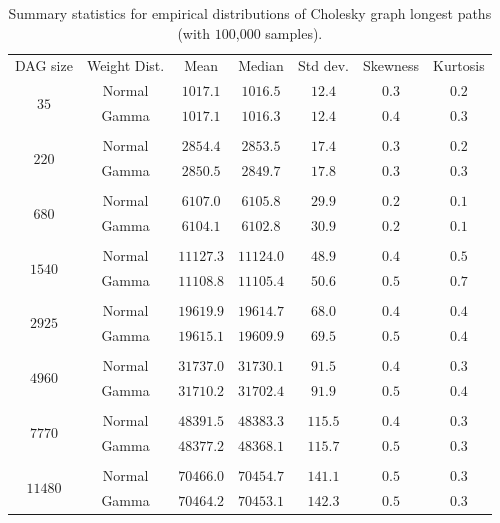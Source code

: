 \documentclass[12pt]{article}
\begin{document}
 \begin{table}
	\caption{Summary statistics for empirical distributions of Cholesky graph longest paths (with $100$,$000$ samples).} 
	\begin{center}	
		\begin{tabular}{c c c c c c c}
                  \toprule
                  DAG size & Weight Dist. & Mean & Median & Std dev. & Skewness & Kurtosis \\
                  \cmidrule{1-7}
                  \multirow{2}{*}{$35$} & Normal & $1017.1$ & $1016.5$ & $12.4$ & $0.3$ & $0.2$\\
                           & Gamma & $1017.1$ & $1016.3$ & $12.4$ & $0.4$ & $0.3$\\
                  \\
                  \multirow{2}{*}{$220$} & Normal & $2854.4$ & $2853.5$ & $17.4$ & $0.3$ & $0.2$\\
                           & Gamma & $2850.5$ & $2849.7$ & $17.8$ & $0.3$ & $0.3$\\
                  \\
                  \multirow{2}{*}{$680$} & Normal & $6107.0$ & $6105.8$ & $29.9$ & $0.2$ & $0.1$\\
                           & Gamma & $6104.1$ & $6102.8$ & $30.9$ & $0.2$ & $0.1$\\
                  \\
                  \multirow{2}{*}{$1540$} & Normal & $11127.3$ & $11124.0$ & $48.9$ & $0.4$ & $0.5$\\
                           & Gamma & $11108.8$ & $11105.4$ & $50.6$ & $0.5$ & $0.7$\\
                  \\
                  \multirow{2}{*}{$2925$} & Normal & $19619.9$ & $19614.7$ & $68.0$ & $0.4$ & $0.4$\\
                           & Gamma & $19615.1$ & $19609.9$ & $69.5$ & $0.5$ & $0.4$\\
                  \\
                  \multirow{2}{*}{$4960$} & Normal & $31737.0$ & $31730.1$ & $91.5$ & $0.4$ & $0.3$\\
                           & Gamma & $31710.2$ & $31702.4$ & $91.9$ & $0.5$ & $0.4$\\
                  \\
                  \multirow{2}{*}{$7770$} & Normal & $48391.5$ & $48383.3$ & $115.5$ & $0.4$ & $0.3$\\
                           & Gamma & $48377.2$ & $48368.1$ & $115.7$ & $0.5$ & $0.3$\\
                  \\
                  \multirow{2}{*}{$11480$} & Normal & $70466.0$ & $70454.7$ & $141.1$ & $0.5$ & $0.3$\\
                           & Gamma & $70464.2$ & $70453.1$ & $142.3$ & $0.5$ & $0.3$\\
		\bottomrule
		\end{tabular}
		\label{tb.emp_summary}
	\end{center}	
      \end{table}
\end{document}
